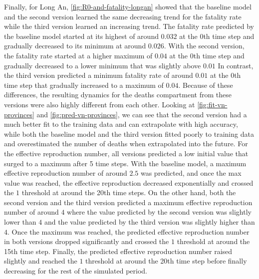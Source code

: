 Finally, for Long An, \autoref{fig:R0-and-fatality-longan} showed that the baseline model and the second version learned the same decreasing trend for the fatality rate while the third version learned an increasing trend.
The fatality rate predicted by the baseline model started at its highest of around $0.032$ at the 0th time step and gradually decreased to its minimum at around $0.026$.
With the second version, the fatality rate started at a higher maximum of $0.04$ at the 0th time step and gradually decreased to a lower minimum that was slightly above $0.01$
In contrast, the third version predicted a minimum fatality rate of around $0.01$ at the 0th time step that gradually increased to a maximum of $0.04$.
Because of these differences, the resulting dynamics for the deaths compartment from these versions were also highly different from each other.
Looking at \autoref{fig:fit-vn-provinces} and \autoref{fig:pred-vn-provinces}, we can see that the second version had a much better fit to the training data and can extrapolate with high accuracy, while both the baseline model and the third version fitted poorly to training data and overestimated the number of deaths when extrapolated into the future.
For the effective reproduction number, all versions predicted a low initial value that surged to a maximum after 5 time steps.
With the baseline model, a maximum effective reproduction number of around $2.5$ was predicted, and once the max value was reached, the effective reproduction decreased exponentially and crossed the $1$ threshold at around the 20th time steps.
On the other hand, both the second version and the third version predicted a maximum effective reproduction number of around $4$ where the value predicted by the second version was slightly lower than $4$ and the value predicted by the third version was slightly higher than $4$.
Once the maximum was reached, the predicted effective reproduction number in both versions dropped significantly and crossed the $1$ threshold at around the 15th time step.
Finally, the predicted effective reproduction number raised slightly and reached the $1$ threshold at around the 20th time step before finally decreasing for the rest of the simulated period.


